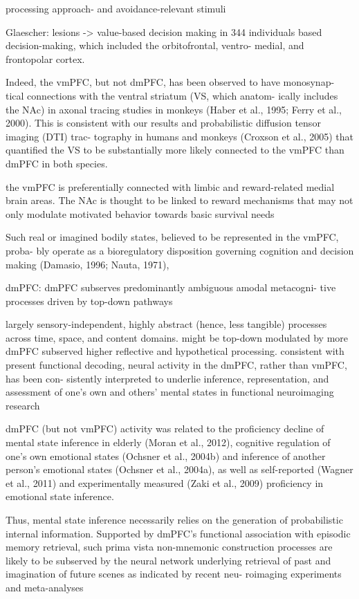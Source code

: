 \documentclass{article} %
\begin{document}
processing approach- and avoidance-relevant stimuli

Glaescher: lesions -> value-based decision making  in 344 individuals 
based decision-making, which included the orbitofrontal, ventro- medial, and frontopolar cortex. 

Indeed, the vmPFC, but not dmPFC, has been observed to have monosynap- tical connections with the ventral striatum (VS, which anatom- ically includes the NAc) in axonal tracing studies in monkeys (Haber et al., 1995; Ferry et al., 2000).
This is consistent with our results and probabilistic diffusion tensor imaging (DTI) trac- tography in humans and monkeys (Croxson et al., 2005) that quantified the VS to be substantially more likely connected to the vmPFC than dmPFC in both species.

the vmPFC is preferentially connected with limbic and reward-related medial brain areas.
The NAc is thought to be linked to reward mechanisms that may not only modulate motivated behavior towards basic survival needs

Such real or imagined bodily states, believed to be represented in the vmPFC, proba- bly operate as a bioregulatory disposition governing cognition and decision making (Damasio, 1996; Nauta, 1971),




dmPFC:
dmPFC subserves predominantly ambiguous amodal metacogni- tive processes driven by top-down pathways

largely sensory-independent, highly abstract (hence, less tangible) processes across time, space, and content domains.
might be top-down modulated by more dmPFC subserved higher reflective and hypothetical processing.
consistent with present functional decoding, neural activity in the dmPFC, rather than vmPFC, has been con- sistently interpreted to underlie inference, representation, and assessment of one’s own and others’ mental states in functional neuroimaging research 

 dmPFC (but not vmPFC) activity was related to the proficiency decline of mental state inference in elderly (Moran et al., 2012), cognitive regulation of one’s own emotional states (Ochsner et al., 2004b) and inference of another person’s emotional states (Ochsner et al., 2004a), as well as self-reported (Wagner et al., 2011) and experimentally measured (Zaki et al., 2009) proficiency in emotional state inference. 

Thus, mental state inference necessarily relies on the generation of probabilistic internal information. Supported by dmPFC’s functional association with episodic memory retrieval, such prima vista non-mnemonic construction processes are likely to be subserved by the neural network underlying retrieval of past and imagination of future scenes as indicated by recent neu- roimaging experiments and meta-analyses
\end{document}
